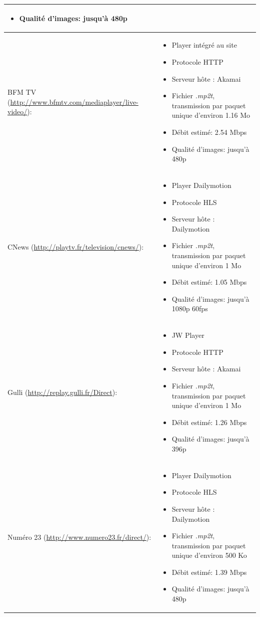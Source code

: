 \documentclass{polytech/polytech}
\begin{document}
\begin{longtabu}{|X|X[1.15]|}
\begin{itemize}
	\item Qualité d'images: jusqu'à 480p
\end{itemize} \\
\hline
BFM TV (\url{http://www.bfmtv.com/mediaplayer/live-video/}):
& \begin{itemize}
	\item Player intégré au site
	\item Protocole HTTP
	\item Serveur hôte : Akamai
	\item Fichier \textit{.mp2t}, transmission par paquet unique d'environ 1.16 Mo
	\item Débit estimé: 2.54 Mbps
	\item Qualité d'images: jusqu'à 480p
\end{itemize} \\
\hline
CNews (\url{http://playtv.fr/television/cnews/}):
& \begin{itemize}
	\item Player Dailymotion
	\item Protocole HLS
	\item Serveur hôte : Dailymotion
	\item Fichier \textit{.mp2t}, transmission par paquet unique d'environ 1 Mo
	\item Débit estimé: 1.05 Mbps
	\item Qualité d'images: jusqu'à 1080p 60fps
\end{itemize} \\
\hline
Gulli (\url{http://replay.gulli.fr/Direct}):
& \begin{itemize}
	\item JW Player
	\item Protocole HTTP
	\item Serveur hôte : Akamai
	\item Fichier \textit{.mp2t}, transmission par paquet unique d'environ 1 Mo
	\item Débit estimé: 1.26 Mbps
	\item Qualité d'images: jusqu'à 396p
\end{itemize} \\
\hline
Numéro 23 (\url{http://www.numero23.fr/direct/}):
& \begin{itemize}
	\item Player Dailymotion
	\item Protocole HLS
	\item Serveur hôte : Dailymotion
	\item Fichier \textit{.mp2t}, transmission par paquet unique d'environ 500 Ko
	\item Débit estimé: 1.39 Mbps
	\item Qualité d'images: jusqu'à 480p
\end{itemize} \\
\hline
\end{longtabu}
\end{document}

